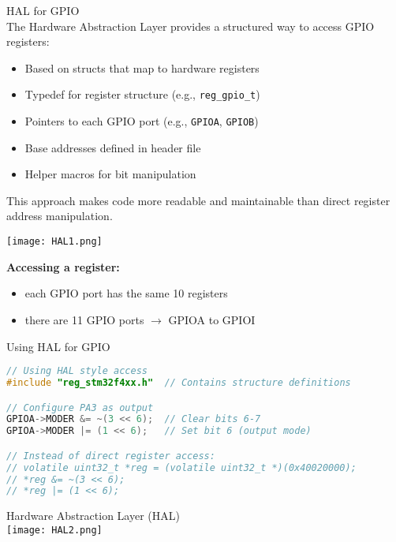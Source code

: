 \begin{definition}{HAL for GPIO}\\
The Hardware Abstraction Layer provides a structured way to access GPIO registers:
\begin{itemize}
    \item Based on structs that map to hardware registers
    \item Typedef for register structure (e.g., \texttt{reg\_gpio\_t})
    \item Pointers to each GPIO port (e.g., \texttt{GPIOA}, \texttt{GPIOB})
    \item Base addresses defined in header file
    \item Helper macros for bit manipulation
\end{itemize}
This approach makes code more readable and maintainable than direct register address manipulation.

\begin{minipage}{0.6\linewidth}
\texttt{[image: HAL1.png]}
\end{minipage}
\begin{minipage}{0.4\linewidth}
    \textbf{Accessing a register:}
    \begin{itemize}
        \item each GPIO port has the same 10 registers 
        \item there are 11 GPIO ports $\rightarrow$ GPIOA to GPIOI
    \end{itemize}
    \end{minipage}
\end{definition}

\begin{code}{Using HAL for GPIO}
\begin{lstlisting}[language=C, style=basesmol] 
// Using HAL style access
#include "reg_stm32f4xx.h"  // Contains structure definitions

// Configure PA3 as output
GPIOA->MODER &= ~(3 << 6);  // Clear bits 6-7
GPIOA->MODER |= (1 << 6);   // Set bit 6 (output mode)

// Instead of direct register access:
// volatile uint32_t *reg = (volatile uint32_t *)(0x40020000);
// *reg &= ~(3 << 6);
// *reg |= (1 << 6);
\end{lstlisting}
\end{code}

\begin{concept}{Hardware Abstraction Layer (HAL)}\\
    \texttt{[image: HAL2.png]}
\end{concept}

